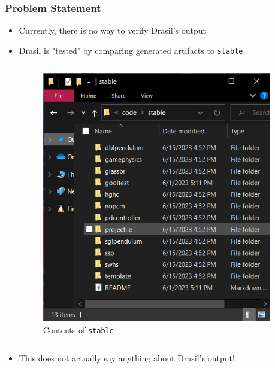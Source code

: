 \documentclass{beamer}
\begin{document}
\begin{frame}
    \frametitle{Problem Statement}
    \begin{itemize}
        \item Currently, there is no way to verify Drasil's output
        \item <2-> Drasil is "tested" by comparing generated
              artifacts to \texttt{stable}
              \begin{columns}[T,onlytextwidth]
                  \begin{column}{.4\textwidth}
                      \begin{figure}
                          \includegraphics[width=.8\textwidth]{assets/stable.png}
                          \caption{Contents of \texttt{stable}}
                          \vspace{-1mm}
                      \end{figure}
                  \end{column}
                  \begin{column}{.6\textwidth}
                      
                      \vspace{-2mm}
                  \end{column}
              \end{columns}
        \item <3-> This does not actually say anything about Drasil's output!
    \end{itemize}
\end{frame}
\end{document}
